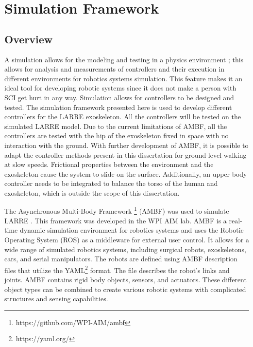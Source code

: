 \chapter{Simulation Framework}
\label{chap:sim}
\section{Overview}

A simulation allows for the modeling and testing in a physics environment \cite{vzlajpah2008simulation}; this allows for analysis and measurements of controllers and their execution in different environments for robotics systems simulation. This feature makes it an ideal tool for developing robotic systems since it does not make a person with SCI get hurt in any way. Simulation allows for controllers to be designed and tested. The simulation framework presented here is used to develop different controllers for the LARRE exoskeleton. All the controllers will be tested on the simulated LARRE model. Due to the current limitations of  AMBF, all the controllers are tested with the hip of the exoskeleton fixed in space with no interaction with the ground. With further development of AMBF, it is possible to adapt the controller methods present in this dissertation for ground-level walking at slow speeds. Frictional properties between the environment and the exoskeleton cause the system to slide on the surface. Additionally, an upper body controller needs to be integrated to balance the torso of the human and exoskeleton, which is outside the scope of this dissertation. 


The Asynchronous Multi-Body Framework \footnote{https://github.com/WPI-AIM/ambf} (AMBF) was used to simulate LARRE \cite{AMBF}. This framework was developed in the WPI AIM lab. AMBF is a real-time dynamic simulation environment for robotics systems and uses the Robotic Operating System (ROS)\cite{quigley2009ros} as a middleware for external user control. It allows for a wide range of simulated robotics systems, including surgical robots, exoskeletons, cars, and serial manipulators. The robots are defined using AMBF description files that utilize the YAML\footnote{https://yaml.org/} format. The file describes the robot's links and joints. AMBF contains rigid body objects, sensors, and actuators. These different object types can be combined to create various robotic systems with complicated structures and sensing capabilities. 
 
